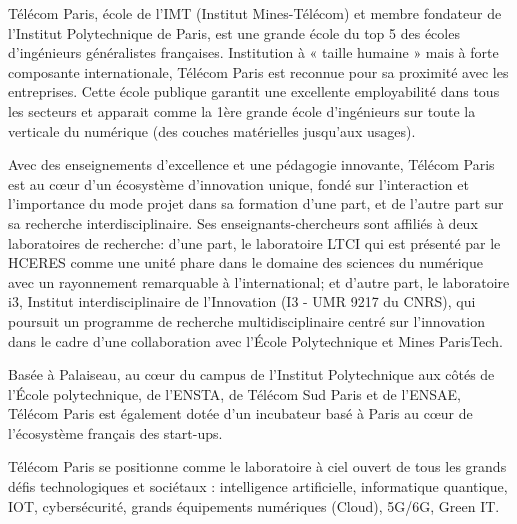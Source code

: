 Télécom Paris, école de l’IMT (Institut Mines-Télécom) et membre fondateur de l’Institut Polytechnique de Paris, est une grande école du top 5 des écoles d’ingénieurs généralistes françaises. Institution à « taille humaine » mais à forte composante internationale, Télécom Paris est reconnue pour sa proximité avec les entreprises. Cette école publique garantit une excellente employabilité dans tous les secteurs et apparait comme la 1ère grande école d’ingénieurs sur toute la verticale du numérique (des couches matérielles jusqu’aux usages).

Avec des enseignements d’excellence et une pédagogie innovante, Télécom Paris est au cœur d'un écosystème d'innovation unique, fondé sur l’interaction et l’importance du mode projet dans sa formation d’une part, et de l’autre part sur sa recherche interdisciplinaire. Ses enseignants-chercheurs sont affiliés à deux laboratoires de recherche: d'une part, le laboratoire LTCI qui est présenté par le HCERES comme une unité phare dans le domaine des sciences du numérique avec un rayonnement remarquable à l’international; et d'autre part, le laboratoire i3, Institut interdisciplinaire de l’Innovation (I3 - UMR 9217 du CNRS), qui poursuit un programme de recherche multidisciplinaire centré sur l’innovation dans le cadre d'une collaboration avec l’École Polytechnique et Mines ParisTech.

Basée à Palaiseau, au cœur du campus de l’Institut Polytechnique aux côtés de l’École polytechnique, de l’ENSTA, de Télécom Sud Paris et de l’ENSAE, Télécom Paris est également dotée d’un incubateur basé à Paris au cœur de l’écosystème français des start-ups.

Télécom Paris se positionne comme le laboratoire à ciel ouvert de tous les grands défis technologiques et sociétaux : intelligence artificielle, informatique quantique, IOT, cybersécurité, grands équipements numériques (Cloud), 5G/6G, Green IT.